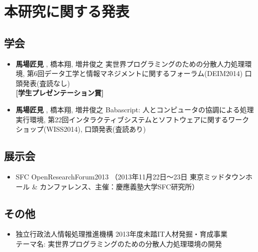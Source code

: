 \chapter*{本研究に関する発表}
\label{chap:publications}

\section*{学会}

\begin{itemize}
\itemsep1pt\parskip0pt
\item
  \textbf{馬場匠見} , 橋本翔, 増井俊之
  実世界プログラミングのための分散人力処理環境,
  第6回データ工学と情報マネジメントに関するフォーラム(DEIM2014)
  口頭発表(査読なし)\\ \textbf{{[}学生プレゼンテーション賞{]}}
\item
  \textbf{馬場匠見} , 橋本翔, 増井俊之 Babascript:
  人とコンピュータの協調による処理実行環境,
  第22回インタラクティブシステムとソフトウェアに関するワークショップ(WISS2014),
  口頭発表(査読あり)
\end{itemize}

\section*{展示会}

\begin{itemize}
\itemsep1pt\parskip0pt
\item
  SFC OpenResearchForum2013 （2013年11月22日〜23日
  東京ミッドタウンホール \&
  カンファレンス、主催：慶應義塾大学SFC研究所）
\end{itemize}

\section*{その他}

\begin{itemize}
\itemsep1pt\parskip0pt
\item
  独立行政法人情報処理推進機構 2013年度未踏IT人材発掘・育成事業\\
  テーマ名: 実世界プログラミングのための分散人力処理環境の開発
\end{itemize}
